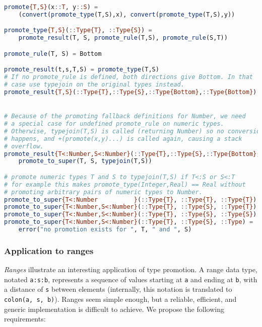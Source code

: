 \begin{singlespace}
\begin{lstlisting}[language=julia]
promote{T,S}(x::T, y::S) =
    (convert(promote_type(T,S),x), convert(promote_type(T,S),y))

promote_type{T,S}(::Type{T}, ::Type{S}) =
    promote_result(T, S, promote_rule(T,S), promote_rule(S,T))

promote_rule(T, S) = Bottom

promote_result(t,s,T,S) = promote_type(T,S)
# If no promote_rule is defined, both directions give Bottom. In that
# case use typejoin on the original types instead.
promote_result{T,S}(::Type{T},::Type{S},::Type{Bottom},::Type{Bottom}) = typejoin(T, S)


# Because of the promoting fallback definitions for Number, we need
# a special case for undefined promote_rule on numeric types.
# Otherwise, typejoin(T,S) is called (returning Number) so no conversion
# happens, and +(promote(x,y)...) is called again, causing a stack
# overflow.
promote_result{T<:Number,S<:Number}(::Type{T},::Type{S},::Type{Bottom},::Type{Bottom}) =
    promote_to_super(T, S, typejoin(T,S))

# promote numeric types T and S to typejoin(T,S) if T<:S or S<:T
# for example this makes promote_type(Integer,Real) == Real without
# promoting arbitrary pairs of numeric types to Number.
promote_to_super{T<:Number          }(::Type{T}, ::Type{T}, ::Type{T}) = T
promote_to_super{T<:Number,S<:Number}(::Type{T}, ::Type{S}, ::Type{T}) = T
promote_to_super{T<:Number,S<:Number}(::Type{T}, ::Type{S}, ::Type{S}) = S
promote_to_super{T<:Number,S<:Number}(::Type{T}, ::Type{S}, ::Type) =
    error("no promotion exists for ", T, " and ", S)
\end{lstlisting}
\end{singlespace}



\subsubsection{Application to ranges}

\emph{Ranges} illustrate an interesting application of type promotion.
A range data type, notated \texttt{a:s:b}, represents a sequence of values
starting at \texttt{a} and ending at \texttt{b}, with a distance of \texttt{s}
between elements (internally, this notation is translated to
\texttt{colon(a, s, b)}). Ranges seem simple enough, but a reliable,
efficient, and generic implementation is difficult to achieve.
We propose the following requirements:

